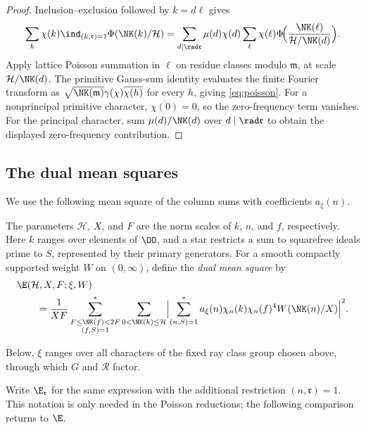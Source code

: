 \begin{proof}
Inclusion--exclusion followed by $k=d\ell$ gives
\[
 \sum_k\chi(k)\ind_{(k,\mathfrak r)=1}\Phi(\NK(k)/\mathcal{H})
 =\sum_{d\mid\rad \mathfrak r}\mu(d)\chi(d)
       \sum_\ell\chi(\ell)\Phi\!\Bigl(\frac{\NK(\ell)}{\mathcal{H}/\NK(d)}\Bigr).
\]
Apply lattice Poisson summation \cite[Theorem~4.5]{IK04} in $\ell$
on residue classes modulo $\mathfrak m$, at scale $\mathcal H/\NK(d)$.
The primitive Gauss-sum identity \cite[(3.12)]{IK04} evaluates the
finite Fourier transform as
$\sqrt{\NK(\mathfrak m)}\gamma(\chi)\overline{\chi(h)}$
for every $h$, giving \eqref{eq:poisson}. For a nonprincipal primitive
character, $\overline{\chi(0)}=0$, so the zero-frequency term vanishes.
For the principal character, sum $\mu(d)/\NK(d)$ over
$d\mid\rad \mathfrak r$ to obtain the displayed zero-frequency contribution.
\end{proof}

\subsection{The dual mean squares} 
We use the following mean square of the column sums with
coefficients $a_\xi(n)$.

\begin{definition}
The parameters $\mathcal H$, $X$, and $F$ are the norm scales of
$k$, $n$, and $f$, respectively. Here $k$ ranges over elements of
$\OO$, and a star restricts a sum to squarefree ideals prime to $S$,
represented by their primary generators. For a smooth compactly
supported weight $W$ on $(0,\infty)$, define the \emph{dual mean square} by
\begin{equation}\label{eq:energy}
 \begin{aligned}
 &\E(\mathcal{H},X,F;\xi,W)\\
 &\qquad=\frac1{XF}
 \sum_{\substack{F\le\NK(f)<2F\\(f,S)=1}}^*\sum_{0<\NK(k)\le \mathcal{H}}
 \Bigl|\sum_{(n,S)=1}^*a_\xi(n)\chi_n(k)\chi_n(f)^4
                  W(\NK(n)/X)\Bigr|^2.
 \end{aligned}
\end{equation}
\end{definition}

Below, $\xi$ ranges over all characters of the fixed ray class group
chosen above, through which $G$ and $\mathcal R$ factor.

Write $\E_{\mathfrak r}$ for the same expression with the additional
restriction $(n,\mathfrak r)=1$. This notation is only needed in the
Poisson reductions; the following comparison returns to $\E$.

